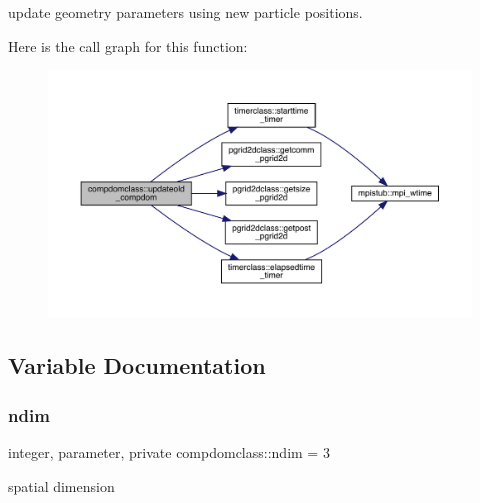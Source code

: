 update geometry parameters using new particle positions. 

Here is the call graph for this function\+:\nopagebreak
\begin{figure}[H]
\begin{center}
\leavevmode
\includegraphics[width=350pt]{namespacecompdomclass_abf3eab7526c06e30b574ddf8be378826_cgraph}
\end{center}
\end{figure}


\subsection{Variable Documentation}
\mbox{\label{namespacecompdomclass_a01f031d8af670f66db4484cd6411e99f}} 
\subsubsection{\texorpdfstring{ndim}{ndim}}
{\footnotesize\ttfamily integer, parameter, private compdomclass\+::ndim = 3\hspace{0.3cm}{\ttfamily [private]}}



spatial dimension 

